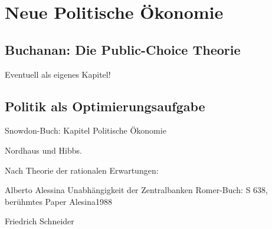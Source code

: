 %
%
%

\chapter{Neue Politische Ökonomie}
\label{Neue_Politik}




\section{Buchanan: Die Public-Choice Theorie}
\label{Pol_Econ}

Eventuell als eigenes Kapitel!


\section{Politik als Optimierungsaufgabe}
Snowdon-Buch: Kapitel Politische Ökonomie

Nordhaus und Hibbs.

Nach Theorie der rationalen Erwartungen:

Alberto Alessina
Unabhängigkeit der Zentralbanken Romer-Buch: S 638, berühmtes Paper Alesina1988

Friedrich Schneider